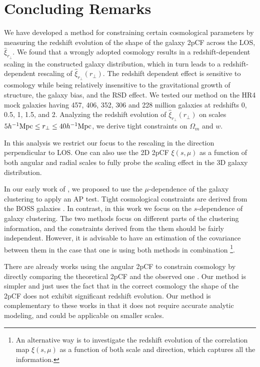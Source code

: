 \documentclass[iop]{emulateapj}
\begin{document}
\section{Concluding Remarks}
 
We have developed a method for constraining certain cosmological parameters by measuring the redshift evolution of the shape of the galaxy 2pCF across the LOS, $\hat \xi_{r_\perp}$.
We found that a wrongly adopted cosmology results in a redshift-dependent scaling in the constructed galaxy distribution,
which in turn leads to a redshift-dependent rescaling of $\hat \xi_{r_\perp}(r_\perp)$.
The redshift dependent effect is sensitive to cosmology while being relatively insensitive to the gravitational growth of structure,
the galaxy bias, and the RSD effect.
We tested our method on the HR4 mock galaxies having 457, 406, 352, 306 and 228 million galaxies at redshifts 0, 0.5, 1, 1.5, and 2.
Analyzing the redshift evolution of $\hat \xi_{r_\perp}(r_\perp)$ 
on scales $5  h^{-1} {\rm Mpc} \leq r_\perp \leq 40 h^{-1} {\rm Mpc}$, 
we derive tight constraints on $\Omega_m$ and $w$.

 
In this analysis we restrict our focus to the rescaling in the direction perpendicular to LOS.
One can also use the 2D 2pCF $\xi(s,\mu)$ 
as a function of both angular and radial scales to fully probe the scaling effect in the 3D galaxy distribution.

In our early work of \cite{Li2015}, 
we proposed to use the $\mu$-dependence of the galaxy clustering to apply an AP test. 
Tight cosmological constraints are derived from the BOSS galaxies \citep{Li2016}. 
In contrast, in this work we focus on the $s$-dependence of galaxy clustering. 
The two methods focus on different parts of the clustering information, and the constraints derived from the them should be fairly independent.
However, it is advisable to have an estimation of the covariance between them in the case that one is using both methods in combination
\footnote{An alternative way is to investigate the redshift evolution of the correlation map $\xi(s,\mu)$ as a function of both scale and direction, which captures all the information.}.

There are already works using the angular 2pCF to constrain cosmology
by directly comparing the theoretical 2pCF and the observed one \citep{Salvador2014,Salvador2016}.
Our method is simpler and just uses the fact that in the correct cosmology the shape of the 2pCF does not exhibit significant redshift evolution.
Our method is complementary to these works in that
it does not require accurate analytic modeling, 
and could be applicable on smaller scales. 
 
\end{document}
